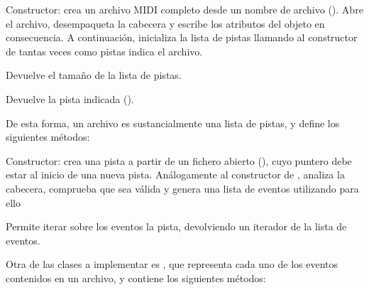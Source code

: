 \begin{description}[style=nextline]
	\item[\code{\_\_init\_\_(self, pathname)}]
	Constructor: crea un archivo \acrshort{MIDI} completo desde un nombre de archivo (). Abre el archivo, desempaqueta la cabecera y escribe los atributos del objeto en consecuencia. A continuación, inicializa la lista de pistas llamando al constructor de  tantas veces como pistas indica el archivo.
	
	\item[\code{\_\_len\_\_(self)}]
	Devuelve el tamaño de la lista de pistas.
	
	\item[\code{\_\_getitem\_\_(self, key)}]
	Devuelve la pista indicada ().
	
\end{description}

De esta forma, un archivo es sustancialmente una lista de pistas, y define los siguientes métodos:

\begin{description}[style=nextline]
	\item[\code{\_\_init\_\_(self, file)}]
	Constructor: crea una pista a partir de un fichero abierto (), cuyo puntero debe estar al inicio de una nueva pista. Análogamente al constructor de , analiza la cabecera, comprueba que sea válida y genera una lista de eventos utilizando para ello 
	
	\item[\code{\_\_iter\_\_(self)}]
	Permite iterar sobre los eventos la pista, devolviendo un iterador de la lista de eventos.	
\end{description}

Otra de las clases a implementar es , que representa cada uno de los eventos contenidos en un archivo, y contiene los siguientes métodos:

